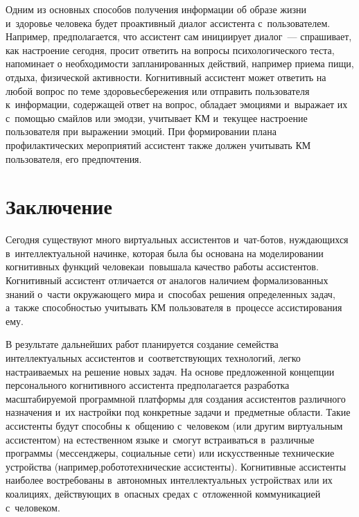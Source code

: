 \begin{multicols}{2}
  Одним из основных способов получения информации об образе жизни 
и~здоровье человека будет проактивный диалог ассистента с~пользователем. 
Например, предполагается, что ассистент сам инициирует диалог~--- 
спрашивает, как настроение сегодня, просит ответить на вопросы 
психологического теста, напоминает о необходимости запланированных 
действий, например приема пищи, отдыха, физической активности. 
Когнитивный ассистент может ответить на любой вопрос по теме 
здо\-ровье\-сбе\-ре\-же\-ния или отправить пользователя к~информации, содержащей 
ответ на вопрос, обладает эмоциями и~выражает их с~помощью смайлов или 
эмодзи, учитывает КМ и~текущее настроение пользователя при 
выражении эмоций. При формировании плана профилактических мероприятий 
ассистент также должен учитывать КМ пользователя, его 
предпочтения. 

\section{Заключение}

  Сегодня существуют много виртуальных ас\-сис\-тен\-тов и~чат-бо\-тов, 
нуждающихся в~интеллектуальной начинке, которая была бы основана на 
моделировании когнитивных функций человека\linebreak и~повышала качество работы 
ассистентов. Когнитивный ассистент отличается от аналогов наличием 
формализованных знаний о~час\-ти окру\-жа\-юще\-го мира и~способах решения 
определенных задач, а~также способностью учитывать КМ
пользователя в~процессе ассистирования ему. 
  
  В результате дальнейших работ планируется создание семейства 
интеллектуальных ассистентов и~соответствующих технологий, легко 
настраиваемых на решение новых задач. На основе предложенной концепции 
персонального когнитивного ас\-сис\-тен\-та предполагается разработка 
масштабируемой программной платформы для создания ас\-сис\-тен\-тов 
различного назначения и~их настройки под конкретные задачи и~предметные 
области. Такие ас\-сис\-тен\-ты будут способны к~общению с~человеком (или 
другим виртуальным ас\-сис\-тен\-том) на естественном языке и~смогут 
встраиваться в~различные программы (мессенджеры, социальные сети) или 
искусственные технические устройства (например,\linebreak робототехнические 
ас\-сис\-тен\-ты). Когнитивные ас\-сис\-тен\-ты наиболее востребованы в~автономных 
интел\-лек\-ту\-аль\-ных устройствах или их коалициях, действующих в~опасных 
средах с~отложенной коммуникацией с~человеком.
  

\end{multicols}
